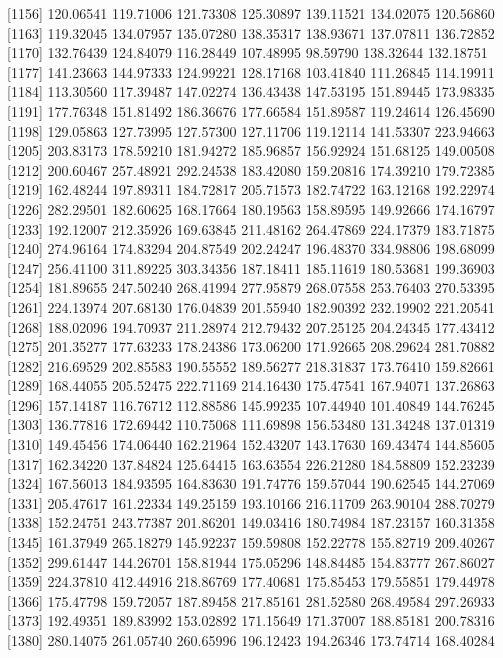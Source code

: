 \documentclass[
  10pt,
  a4paper,oneside]{article}
\begin{document}
{[}1156{]} 120.06541 119.71006 121.73308 125.30897 139.11521 134.02075 120.56860
{[}1163{]} 119.32045 134.07957 135.07280 138.35317 138.93671 137.07811 136.72852
{[}1170{]} 132.76439 124.84079 116.28449 107.48995 98.59790 138.32644 132.18751
{[}1177{]} 141.23663 144.97333 124.99221 128.17168 103.41840 111.26845 114.19911
{[}1184{]} 113.30560 117.39487 147.02274 136.43438 147.53195 151.89445 173.98335
{[}1191{]} 177.76348 151.81492 186.36676 177.66584 151.89587 119.24614 126.45690
{[}1198{]} 129.05863 127.73995 127.57300 127.11706 119.12114 141.53307 223.94663
{[}1205{]} 203.83173 178.59210 181.94272 185.96857 156.92924 151.68125 149.00508
{[}1212{]} 200.60467 257.48921 292.24538 183.42080 159.20816 174.39210 179.72385
{[}1219{]} 162.48244 197.89311 184.72817 205.71573 182.74722 163.12168 192.22974
{[}1226{]} 282.29501 182.60625 168.17664 180.19563 158.89595 149.92666 174.16797
{[}1233{]} 192.12007 212.35926 169.63845 211.48162 264.47869 224.17379 183.71875
{[}1240{]} 274.96164 174.83294 204.87549 202.24247 196.48370 334.98806 198.68099
{[}1247{]} 256.41100 311.89225 303.34356 187.18411 185.11619 180.53681 199.36903
{[}1254{]} 181.89655 247.50240 268.41994 277.95879 268.07558 253.76403 270.53395
{[}1261{]} 224.13974 207.68130 176.04839 201.55940 182.90392 232.19902 221.20541
{[}1268{]} 188.02096 194.70937 211.28974 212.79432 207.25125 204.24345 177.43412
{[}1275{]} 201.35277 177.63233 178.24386 173.06200 171.92665 208.29624 281.70882
{[}1282{]} 216.69529 202.85583 190.55552 189.56277 218.31837 173.76410 159.82661
{[}1289{]} 168.44055 205.52475 222.71169 214.16430 175.47541 167.94071 137.26863
{[}1296{]} 157.14187 116.76712 112.88586 145.99235 107.44940 101.40849 144.76245
{[}1303{]} 136.77816 172.69442 110.75068 111.69898 156.53480 131.34248 137.01319
{[}1310{]} 149.45456 174.06440 162.21964 152.43207 143.17630 169.43474 144.85605
{[}1317{]} 162.34220 137.84824 125.64415 163.63554 226.21280 184.58809 152.23239
{[}1324{]} 167.56013 184.93595 164.83630 191.74776 159.57044 190.62545 144.27069
{[}1331{]} 205.47617 161.22334 149.25159 193.10166 216.11709 263.90104 288.70279
{[}1338{]} 152.24751 243.77387 201.86201 149.03416 180.74984 187.23157 160.31358
{[}1345{]} 161.37949 265.18279 145.92237 159.59808 152.22778 155.82719 209.40267
{[}1352{]} 299.61447 144.26701 158.81944 175.05296 148.84485 154.83777 267.86027
{[}1359{]} 224.37810 412.44916 218.86769 177.40681 175.85453 179.55851 179.44978
{[}1366{]} 175.47798 159.72057 187.89458 217.85161 281.52580 268.49584 297.26933
{[}1373{]} 192.49351 189.83992 153.02892 171.15649 171.37007 188.85181 200.78316
{[}1380{]} 280.14075 261.05740 260.65996 196.12423 194.26346 173.74714 168.40284
\end{document}
